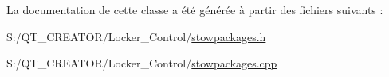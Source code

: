 La documentation de cette classe a été générée à partir des fichiers suivants \+:\begin{DoxyCompactItemize}
\item 
S\+:/\+Q\+T\+\_\+\+C\+R\+E\+A\+T\+O\+R/\+Locker\+\_\+\+Control/\hyperlink{stowpackages_8h}{stowpackages.\+h}\item 
S\+:/\+Q\+T\+\_\+\+C\+R\+E\+A\+T\+O\+R/\+Locker\+\_\+\+Control/\hyperlink{stowpackages_8cpp}{stowpackages.\+cpp}\end{DoxyCompactItemize}
